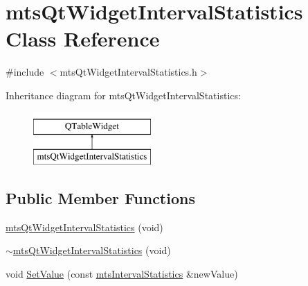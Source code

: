 \hypertarget{classmts_qt_widget_interval_statistics}{}\section{mts\+Qt\+Widget\+Interval\+Statistics Class Reference}
\label{classmts_qt_widget_interval_statistics}


{\ttfamily \#include $<$mts\+Qt\+Widget\+Interval\+Statistics.\+h$>$}

Inheritance diagram for mts\+Qt\+Widget\+Interval\+Statistics\+:\begin{figure}[H]
\begin{center}
\leavevmode
\includegraphics[height=2.000000cm]{d0/dcf/classmts_qt_widget_interval_statistics}
\end{center}
\end{figure}
\subsection*{Public Member Functions}
\begin{DoxyCompactItemize}
\item 
\hyperlink{classmts_qt_widget_interval_statistics_a394077f43d0df6d596e53729195ec3ed}{mts\+Qt\+Widget\+Interval\+Statistics} (void)
\item 
\hyperlink{classmts_qt_widget_interval_statistics_aaf177bc6e4838b81d078bd04d971d97d}{$\sim$mts\+Qt\+Widget\+Interval\+Statistics} (void)
\item 
void \hyperlink{classmts_qt_widget_interval_statistics_a02d85a7b46366214eaad37d202096534}{Set\+Value} (const \hyperlink{classmts_interval_statistics}{mts\+Interval\+Statistics} \&new\+Value)
\end{DoxyCompactItemize}
